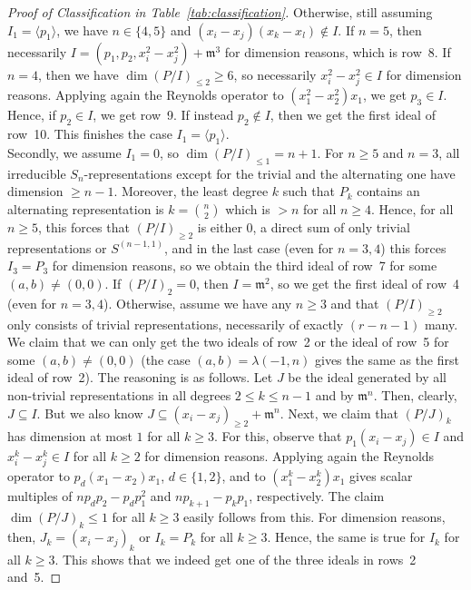 \documentclass[11pt]{amsart}
\theoremstyle{definition}
\newcommand{\mm}{\mathfrak{m}}
\begin{document}
\begin{proof}[Proof of Classification in Table~\ref{tab:classification}]
    Otherwise, still assuming $I_1 = \langle p_1 \rangle$, we have $n \in \{4,5\}$ and $(x_i-x_j)(x_k-x_l) \not\in I$.
    If $n=5$, then necessarily $I = (p_1,p_2,x_i^2-x_j^2) + \mm^3$ for dimension reasons, which is row~8.
    If $n=4$, then we have $\dim(P/I)_{\leq 2} \geq 6$, so necessarily $x_i^2-x_j^2 \in I$ for dimension reasons. Applying again the Reynolds operator to $(x_1^2-x_2^2)x_1$, we get $p_3 \in I$. Hence, if $p_2 \in I$, we get row~9. If instead $p_2 \not\in I$, then we get the first ideal of row~10. This finishes the case $I_1 = \langle p_1 \rangle$.\\
    
    Secondly, we assume $I_1 = 0$, so $\dim(P/I)_{\leq 1} = n+1$. For $n \geq 5$ and $n=3$, all irreducible $S_n$-representations except for the trivial and the alternating one have dimension $\geq n-1$. Moreover, the least degree $k$ such that $P_k$ contains an alternating representation is $k = \binom{n}{2}$ which is $>n$ for all $n \geq 4$. Hence, for all $n \geq 5$, this forces that $(P/I)_{\geq 2}$ is either $0$, a direct sum of only trivial representations or $S^{(n-1,1)}$, and in the last case (even for $n=3,4$) this forces $I_3 = P_3$ for dimension reasons, so we obtain the third ideal of row~7 for some $(a,b) \neq (0,0)$. If $(P/I)_2 = 0$, then $I = \mm^2$, so we get the first ideal of row~4 (even for $n=3,4$). Otherwise, assume we have any $n \geq 3$ and that $(P/I)_{\geq 2}$ only consists of trivial representations, necessarily of exactly $(r-n-1)$ many. We claim that we can only get the two ideals of row~2 or the ideal of row~5 for some $(a,b) \neq (0,0)$ (the case $(a,b) = \lambda (-1,n)$ gives the same as the first ideal of row~2). The reasoning is as follows. Let $J$ be the ideal generated by all non-trivial representations in all degrees $2 \leq k \leq n-1$ and by $\mm^n$. Then, clearly, $J \subseteq I$. But we also know $J \subseteq (x_i-x_j)_{\geq 2} + \mm^n$. Next, we claim that $(P/J)_k$ has dimension at most $1$ for all $k \geq 3$. For this, observe that $p_1(x_i-x_j) \in I$ and $x_i^k-x_j^k \in I$ for all $k \geq 2$ for dimension reasons. Applying again the Reynolds operator to $p_d(x_1-x_2)x_1$, $d \in \{1,2\}$, and to $(x_1^k-x_2^k)x_1$ gives scalar multiples of $n p_d p_2 - p_d p_1^2$ and $np_{k+1} - p_kp_1$, respectively. The claim $\dim(P/J)_k \leq 1$ for all $k \geq 3$ easily follows from this. For dimension reasons, then, $J_k = (x_i-x_j)_k$ or $I_k = P_k$ for all $k \geq 3$. Hence, the same is true for $I_k$ for all $k \geq 3$. This shows that we indeed get one of the three ideals in rows~2 and~5.
    

\end{proof}
\end{document}
